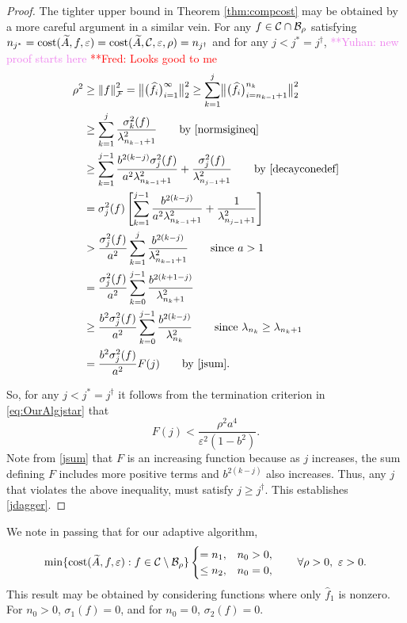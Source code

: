 \documentclass[graybox,footinfo]{svmult}
\newcommand{\DHJRnorm}[2][{}]{\ensuremath{\left \lVert #2 \right \rVert}_{#1}}
\newcommand{\DHJRbignorm}[2][{}]{\ensuremath{\bigl \lVert #2 \bigr \rVert}_{#1}}
\newcommand{\frednote}[1]{  {\textcolor{red}  {\mbox{**Fred:} #1}}}
\newcommand{\yuhannote}[1]{ {\textcolor{violet}  {\mbox{**Yuhan:} #1}}}
\begin{document}
\begin{proof}
The tighter upper bound in Theorem \ref{thm:compcost} may be obtained by a more careful argument in a similar vein.  
For any $f \in  {\mathcal{C}} \cap {\mathcal{B}}_\rho$ satisfying $n_{j^*} = \textup{cost}(\widetilde{A},f,\varepsilon) = \textup{cost}(\widetilde{A}, {\mathcal{C}}, \varepsilon, \rho) = n_{j^{\dagger}}$ and for any $j < j^* = j^\dagger$,
\yuhannote{new proof starts here}\frednote{Looks good to me}
\begin{align*}
\rho^2 &\ge \DHJRnorm[\calF]{f}^2 = \DHJRbignorm[2]{\big( \widehat{f}_i \big)_{i=1}^{\infty}}^2  \ge \sum_{k=1}^j \DHJRbignorm[2]{\big( \widehat{f}_i \big)_{i=n_{k-1}+1}^{n_k}}^2 \\
& \ge \sum_{k=1}^j \frac{\sigma_k^2(f)}{\lambda_{n_{k-1}+1}^2} \qquad \text{by \eqref{normsigineq}}\\
& \ge \sum_{k=1}^{j-1} \frac{ b^{2(k-j)}\sigma_j^2(f)}{a^{2}\lambda_{n_{k-1}+1}^2} + \frac{\sigma_j^2(f)}{\lambda_{n_{j-1}+1}^2} \qquad \text{by \eqref{decayconedef}} \\
& = \sigma_j^2(f) \left[ \sum_{k=1}^{j-1} \frac{b^{2(k-j)}}{a^{2} \lambda_{n_{k-1}+1}^2} + \frac{1}{\lambda_{n_{j-1}+1}^2}\right]\\
&> \frac{ \sigma_j^2(f)}{a^2} \sum_{k=1}^{j} \frac{b^{2(k-j)}}{\lambda_{n_{k-1}+1}^2}  \qquad \text{since } a > 1\\
&= \frac{ \sigma_j^2(f)}{a^2}\sum_{k=0}^{j-1} \frac{b^{2(k+1-j)}}{\lambda_{n_{k}+1}^2}  \\
& \ge  \frac{b^2 \sigma_j^2(f)}{a^2} \sum_{k=0}^{j-1} \frac{b^{2(k-j)}}{\lambda_{n_{k}}^2}  \qquad \text{since } \lambda_{n_k} \ge \lambda_{n_k+1}\\
& = \frac{b^2 \sigma_j^2(f)}{a^2} F(j)
\qquad \text{by } \eqref{jsum}.
\end{align*}

So, for any $j < j^* = j^\dagger$ it follows from the termination criterion in \eqref{eq:OurAlgjstar} that
\begin{equation*}
 F(j) < \frac{ \rho^2 a^4}{\varepsilon^2(1 - b^2)}.
\end{equation*}
Note from \eqref{jsum} that $F$ is an increasing function because as $j$ increases, the sum defining $F$ includes more positive terms and $b^{2(k-j)}$ also increases. Thus, any $j$ that violates the above inequality, must satisfy $j \ge j^\dagger$.  This establishes \eqref{jdagger}.
\end{proof}

We note in passing that for our adaptive algorithm,
\begin{equation*}
 \min \{\textup{cost}(\widetilde{A},f,\varepsilon) : f \in {\mathcal{C}}\setminus {\mathcal{B}}_\rho \} 
 \begin{cases} = n_1, & n_0 > 0, \\
 \le n_2, & n_0 = 0, 
 \end{cases}
 \qquad \forall \rho > 0, \ \varepsilon > 0.
\end{equation*}
This result may be obtained by considering functions where only $\widehat{f}_1$ is nonzero.  For $n_0 > 0$, $\sigma_1(f) = 0$, and for $n_0 = 0$, $\sigma_2(f) = 0$.
\end{document}
